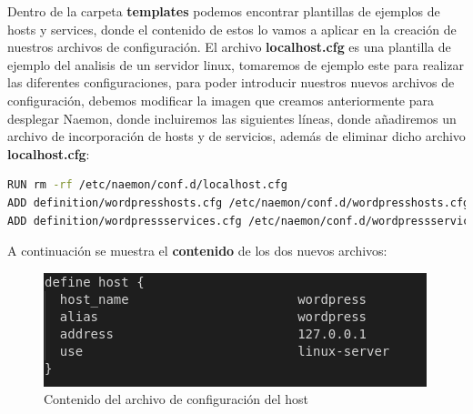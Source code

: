 Dentro de la carpeta \textbf{templates} podemos encontrar plantillas de ejemplos de hosts y services, donde el contenido de estos lo vamos a aplicar en la creación de nuestros archivos de configuración.
\newpage
El archivo \textbf{localhost.cfg} es una plantilla de ejemplo del analisis de un servidor linux, tomaremos de ejemplo este para realizar las diferentes configuraciones, para poder introducir nuestros nuevos archivos de configuración, debemos modificar la imagen que creamos anteriormente para desplegar Naemon, donde incluiremos las siguientes líneas, donde añadiremos un archivo de incorporación de hosts y de servicios, además de eliminar dicho archivo \textbf{localhost.cfg}:

\begin{lstlisting}[language=bash]
RUN rm -rf /etc/naemon/conf.d/localhost.cfg
ADD definition/wordpresshosts.cfg /etc/naemon/conf.d/wordpresshosts.cfg 
ADD definition/wordpressservices.cfg /etc/naemon/conf.d/wordpressservices.cfg 
\end{lstlisting}

A continuación se muestra el \textbf{contenido} de los dos nuevos archivos:

\begin{figure}[H]
	\centering
	\includegraphics[scale=0.4]{imagenes/wordpress/analisis_naemon/host.png}
	\caption{Contenido del archivo de configuración del host} \label{host}
\end{figure}


